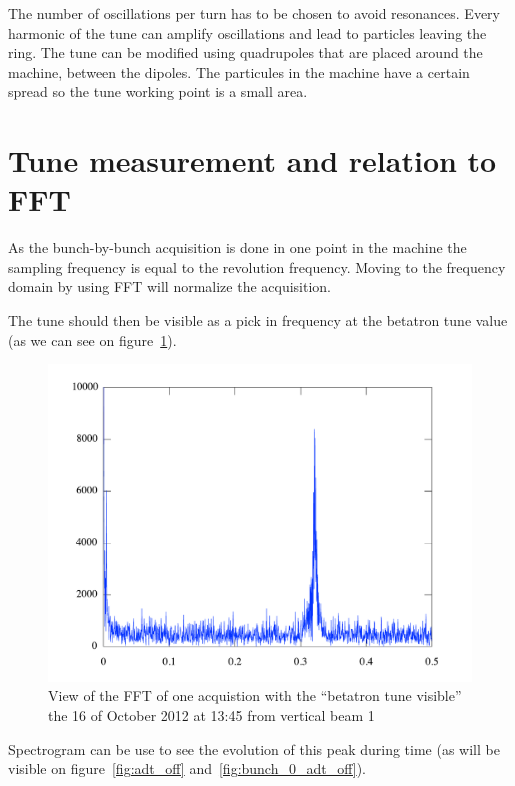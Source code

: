 The number of oscillations per turn has to be chosen to avoid resonances. Every harmonic of the tune can amplify oscillations and lead to particles leaving the ring. The tune can be modified using quadrupoles that are placed around the machine, between the dipoles. The particules in the machine have a certain spread so the tune working point is a small area.

\section{Tune measurement and relation to FFT}

As the bunch-by-bunch acquisition is done in one point in the machine the sampling frequency is equal to the revolution frequency. Moving to the frequency domain by using \gls{FFT} will normalize the acquisition.

The tune should then be visible as a pick in frequency at the betatron tune value (as we can see on figure~\ref{fig:tune_single}).

\begin{figure}[H]
\centering
\label{fig:tune_single}
\caption{View of the FFT of one acquistion with the ``betatron tune visible'' the 16 of October 2012 at 13:45 from vertical beam 1}
\includegraphics[scale=0.5]{fft_single.pdf}
\end{figure}

Spectrogram can be use to see the evolution of this peak during time (as will be visible on figure~\ref{fig:adt_off} and~\ref{fig:bunch_0_adt_off}).

